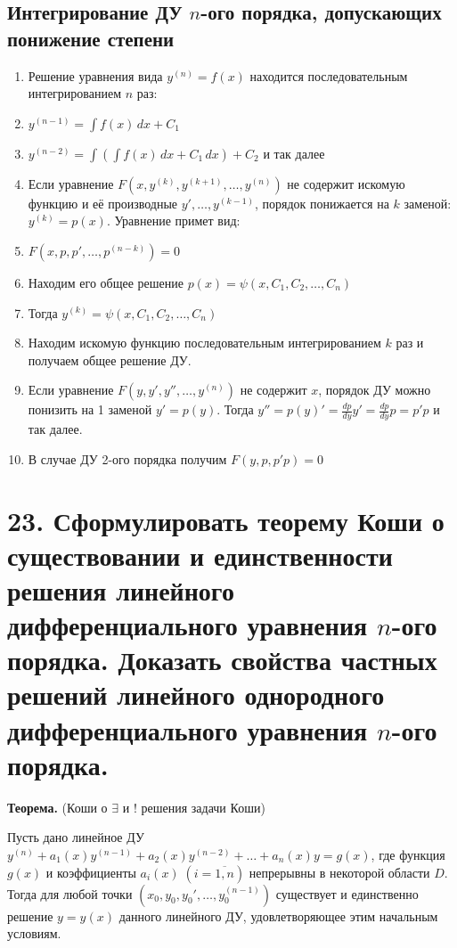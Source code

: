 \documentclass[11pt]{article}
\begin{document}
\subsection*{Интегрирование ДУ $n$-ого порядка, допускающих понижение степени}
\begin{enumerate}
\item Решение уравнения вида $y^{(n)} = f(x)$ находится последовательным интегрированием $n$ раз:
\item[] $y^{(n-1)} = \int f(x) \, dx + C_{1}$
\item[] $y^{(n-2)} = \int \left(\int f(x) \, dx + C_{1} \, dx\right) + C_{2}$ и так далее
\item Если уравнение $F(x, y^{(k)}, y^{(k+1)}, \dots, y^{(n)})$ не содержит искомую функцию и её производные $y', \dots, y^{(k - 1)}$, порядок понижается на $k$ заменой: $y^{(k)} = p(x)$. Уравнение примет вид:
\item[] $F(x, p, p', \dots, p^{(n - k)}) = 0$
\item[] Находим его общее решение $p(x) = \psi(x, C_{1}, C_{2}, \dots, C_{n})$
\item[] Тогда $y^{(k)} = \psi(x, C_{1}, C_{2}, \dots, C_{n})$
\item[] Находим искомую функцию последовательным интегрированием $k$ раз и получаем общее решение ДУ.
\item Если уравнение $F(y, y', y'', \dots, y^{(n)})$ не содержит $x$, порядок ДУ можно понизить на 1 заменой $y' = p(y)$. Тогда $y'' = p(y)' = \frac{dp}{dy}y' = \frac{dp}{dy} p = p'p$ и так далее.
\item[] В случае ДУ 2-ого порядка получим $F(y, p, p'p) = 0$
\end{enumerate}

\section*{23. Сформулировать теорему Коши о существовании и единственности решения линейного дифференциального уравнения $n$-ого порядка. Доказать свойства частных решений линейного однородного дифференциального уравнения $n$-ого порядка.}
\par\textbf{Теорема.} (Коши о $\exists$ и $!$ решения задачи Коши)
\par Пусть дано линейное ДУ $y^{(n)} + a_{1}(x)y^{(n-1)} + a_{2}(x)y^{(n-2)} + \dots + a_{n}(x)y = g(x)$, где функция $g(x)$ и коэффициенты $a_{i}(x) \; (i = \overline{1, n})$ непрерывны в некоторой области $D$. Тогда для любой точки $(x_{0}, y_{0}, y_{0}', \dots, y_{0}^{(n-1)})$ существует и единственно решение $y = y(x)$ данного линейного ДУ, удовлетворяющее этим начальным условиям.
\end{document}

